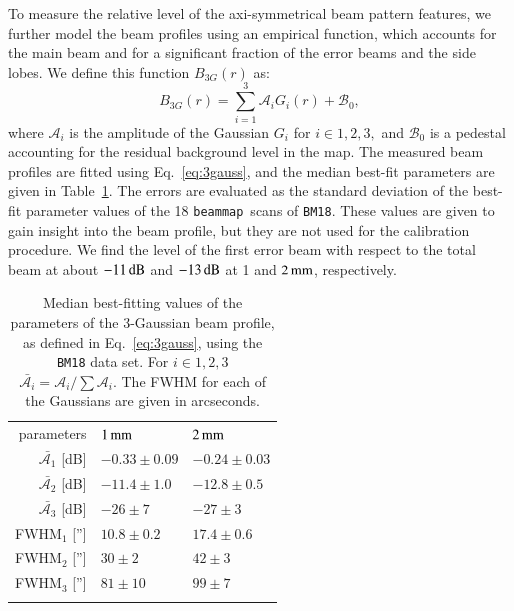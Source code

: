 \documentclass[traditionalabstract]{aa}
\newcommand{\bm}{{\tt beammap}}
\newcommand{\lp}[1]{#1}
\newcommand{\LEt}[1]{{\bf {\color[RGB]{0, 153, 255} #1}}}
\begin{document}
{{\lp To measure the relative level of the axi-symmetrical beam pattern
features, we further model the beam profiles using an empirical function,
which accounts for the main beam and for a significant fraction of the
error beams and the side lobes. We define this function $B_{3G}(r)$ as:
\begin{equation}
  B_{3G}(r) = \sum_{i=1}^{3} \mathcal{A}_i G_i(r) + \mathcal{B}_0,
  \label{eq:3gauss}
\end{equation}
where $\mathcal{A}_i$ is the amplitude of the Gaussian $G_i$ for
$i \in {1, 2, 3,}$ and $\mathcal{B}_0$ is a pedestal accounting for
the residual background level in the map. The measured beam profiles
are fitted using Eq.~\ref{eq:3gauss}, and the median best-fit
parameters are given in Table~\ref{tab:mean_3gauss_fit}. The errors
are evaluated as the standard deviation of the best-fit %
parameter values of the 18 \bm\ scans of {\tt BM18}.
These values are given to gain insight into the beam profile, but they are not
used for the calibration procedure. We find the level of the first error
beam with respect to the total beam at about $-11\,\rm{dB}$ and
$-13\,\rm{dB}$ at 1 and $2\,\rm{mm}$, respectively.}
%
\begin{table}[!th]
   \caption{{\lp Median best-fitting values of the parameters of the
  3-Gaussian beam profile, as defined in Eq.~\ref{eq:3gauss}, using
  the {\tt BM18} data set. For $i \in {1, 2, 3}$ $\bar{\mathcal{A}_i}
  =\mathcal{A}_i / \sum{\mathcal{A}_i}$.
  The FWHM for each of the Gaussians are given in arcseconds.}}
  \label{tab:mean_3gauss_fit}
  \begin{center}
    \begin{tabular}{rll}
      \hline\hline
      \noalign{\smallskip}
       parameters  &  $1\,\rm{mm}$  & $2\,\rm{mm}$ \\
       \noalign{\smallskip} 
      \hline
      \noalign{\smallskip} 
      $\bar{\mathcal{A}_1}$ [dB] &   $-0.33 \pm 0.09$   &  $-0.24 \pm 0.03$ \\
      $\bar{\mathcal{A}_2}$ [dB] &   $-11.4 \pm 1.0$     &  $-12.8 \pm 0.5$   \\
      $\bar{\mathcal{A}_3}$ [dB] &   $-26 \pm 7$       &  $-27 \pm 3$    \\
      FWHM$_1$  ['']             &   $10.8 \pm 0.2$    &  $17.4 \pm 0.6 $ \\
      FWHM$_2$  ['']             &   $30 \pm 2$        &  $42 \pm 3 $ \\
      FWHM$_3$  ['']             &   $81 \pm 10$       &  $99 \pm 7 $ \\     
       \noalign{\smallskip}   
      \hline
    \end{tabular}    
  \end{center}
\end{table}
%

}
\end{document}

